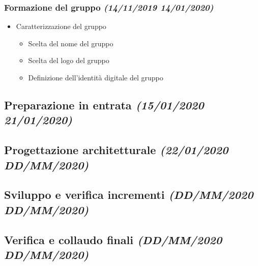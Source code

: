 \documentclass[../piano-di-progetto.tex]{subfiles}
\begin{document}
\subsubsection[Formazione del gruppo]{Formazione del gruppo {\normalsize\normalfont\itshape(14/11/2019  14/01/2020)}}%
\label{subs:formazione_del_gruppo}
\begin{itemize}
  \item Caratterizzazione del gruppo
  \begin{itemize}
    \item Scelta del nome del gruppo
    \item Scelta del logo del gruppo
    \item Definizione dell'identità digitale del gruppo
  \end{itemize}
\end{itemize}
\subsection[Preparazione in entrata]{Preparazione in entrata {\normalsize\normalfont\itshape(15/01/2020  21/01/2020)}}%
\label{sub:preparazione_in_entrata}

\subsection[Progettazione architetturale]{Progettazione architetturale {\normalsize\normalfont\itshape(22/01/2020  DD/MM/2020)}}%
\label{sub:progettazione_architetturale}

\subsection[Sviluppo e verifica incrementi]{Sviluppo e verifica incrementi {\normalsize\normalfont\itshape(DD/MM/2020  DD/MM/2020)}}%
\label{sub:sviluppo_e_verifica_incrementi}

\subsection[Verifica e collaudo finali]{Verifica e collaudo finali {\normalsize\normalfont\itshape(DD/MM/2020  DD/MM/2020)}}%
\label{sub:verifica_e_collaudo_finali}

\end{document}
